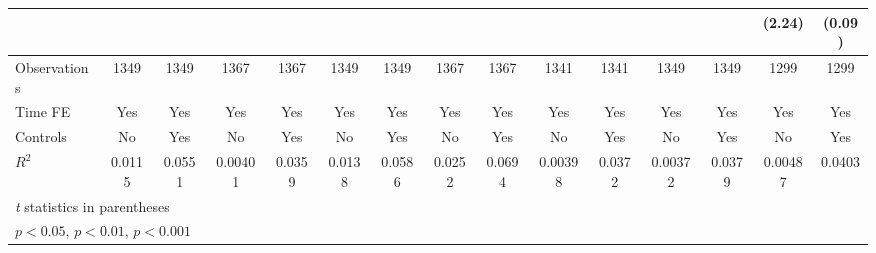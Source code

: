 {\begin{tabular}{l*{14}{c}}
                &                  &                  &                  &                  &                  &                  &                  &                  &                  &                  &                  &                  &   (2.24)         &   (0.09)         \\
\hline
Observations    &     1349         &     1349         &     1367         &     1367         &     1349         &     1349         &     1367         &     1367         &     1341         &     1341         &     1349         &     1349         &     1299         &     1299         \\
Time FE         &      Yes         &      Yes         &      Yes         &      Yes         &      Yes         &      Yes         &      Yes         &      Yes         &      Yes         &      Yes         &      Yes         &      Yes         &      Yes         &      Yes         \\
Controls        &       No         &      Yes         &       No         &      Yes         &       No         &      Yes         &       No         &      Yes         &       No         &      Yes         &       No         &      Yes         &       No         &      Yes         \\
$ R^2 $         &   0.0115         &   0.0551         &  0.00401         &   0.0359         &   0.0138         &   0.0586         &   0.0252         &   0.0694         &  0.00398         &   0.0372         &  0.00372         &   0.0379         &  0.00487         &   0.0403         \\
\hline\hline
\multicolumn{15}{l}{\footnotesize \textit{t} statistics in parentheses}\\
\multicolumn{15}{l}{\footnotesize \sym{*} \(p<0.05\), \sym{**} \(p<0.01\), \sym{***} \(p<0.001\)}\\
\end{tabular}
}
